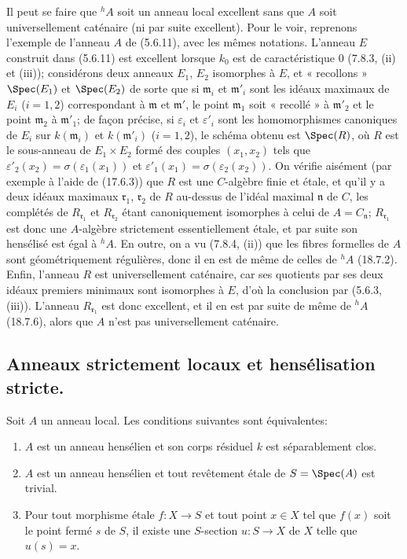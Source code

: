 \begin{remark}[18.7.7]
\label{IV.18.7.7}
Il peut se faire que ${}^h\!A$ soit un anneau local excellent sans que $A$ soit universellement caténaire (ni par suite excellent). Pour le voir, reprenons l'exemple de l'anneau $A$ de (5.6.11), avec les mêmes notations. L'anneau $E$ construit dans (5.6.11) est excellent lorsque $k_0$ est de caractéristique $0$ (7.8.3, (ii) et (iii)); considérons deux anneaux $E_1$, $E_2$ isomorphes à $E$, et « recollons » $\Spec(E_1)$ et $\Spec(E_2)$ de sorte que si $\mathfrak m_i$ et $\mathfrak m'_i$ sont les idéaux maximaux de $E_i$ ($i=1,2$) correspondant à $\mathfrak m$ et $\mathfrak m'$, le point $\mathfrak m_1$ soit « recollé » à $\mathfrak m'_2$ et le point $\mathfrak m_2$ à $\mathfrak m'_1$; de façon précise, si $\varepsilon_i$ et $\varepsilon'_i$ sont les homomorphismes canoniques de $E_i$ sur $k(\mathfrak m_i)$ et $k(\mathfrak m'_i)$ ($i=1,2$), le schéma obtenu est $\Spec(R)$, où $R$ est le sous-anneau de $E_1\times E_2$ formé des couples $(x_1,x_2)$ tels que $\varepsilon'_2(x_2)=\sigma(\varepsilon_1(x_1))$ et $\varepsilon'_1(x_1)=\sigma(\varepsilon_2(x_2))$. On vérifie aisément (par exemple à l'aide de (17.6.3)) que $R$ est une $C$-algèbre finie et étale, et qu'il y a deux idéaux maximaux $\mathfrak r_1$, $\mathfrak r_2$ de $R$ au-dessus de l'idéal maximal $\mathfrak n$ de $C$, les complétés de $R_{\mathfrak r_1}$ et $R_{\mathfrak r_2}$ étant canoniquement isomorphes à celui de $A=C_{\mathfrak n}$; $R_{\mathfrak r_1}$ est donc une $A$-algèbre strictement essentiellement étale, et par suite son hensélisé est égal à ${}^h\!A$. En outre, on a vu (7.8.4, (ii)) que les fibres formelles de $A$ sont géométriquement régulières, donc il en est de même de celles de ${}^h\!A$ (18.7.2). Enfin, l'anneau $R$ est universellement caténaire, car ses quotients par ses deux idéaux premiers minimaux sont isomorphes à $E$, d'où la conclusion par (5.6.3, (iii)). L'anneau $R_{\mathfrak r_1}$ est donc excellent, et il en est par suite de même de ${}^h\!A$ (18.7.6), alors que $A$ n'est pas universellement caténaire.
\end{remark}

\subsection{Anneaux strictement locaux et hensélisation stricte.}

\begin{proposition}[18.8.1]
\label{IV.18.8.1}
Soit $A$ un anneau local. Les conditions suivantes sont équivalentes:
\begin{enumerate}
  \item[$a)$] $A$ est un anneau hensélien et son corps résiduel $k$ est séparablement clos.
  \item[$b)$] $A$ est un anneau hensélien et tout revêtement étale de $S=\Spec(A)$ est trivial.
  \item[$c)$] Pour tout morphisme étale $f:X\to S$ et tout point $x\in X$ tel que $f(x)$ soit le point fermé $s$ de $S$, il existe une $S$-section $u:S\to X$ de $X$ telle que $u(s)=x$.
\end{enumerate}
\end{proposition}

